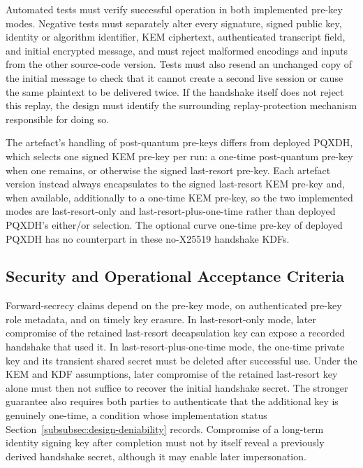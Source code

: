 Automated tests must verify successful operation in both implemented pre-key modes. Negative tests must separately alter every signature, signed public key, identity or algorithm identifier, KEM ciphertext, authenticated transcript field, and initial encrypted message, and must reject malformed encodings and inputs from the other source-code version. Tests must also resend an unchanged copy of the initial message to check that it cannot create a second live session or cause the same plaintext to be delivered twice. If the handshake itself does not reject this replay, the design must identify the surrounding replay-protection mechanism responsible for doing so.

The artefact's handling of post-quantum pre-keys differs from deployed PQXDH, which selects one signed KEM pre-key per run: a one-time post-quantum pre-key when one remains, or otherwise the signed last-resort pre-key. Each artefact version instead always encapsulates to the signed last-resort KEM pre-key and, when available, additionally to a one-time KEM pre-key, so the two implemented modes are last-resort-only and last-resort-plus-one-time rather than deployed PQXDH's either/or selection. The optional curve one-time pre-key of deployed PQXDH has no counterpart in these no-X25519 handshake KDFs.

\subsection{Security and Operational Acceptance Criteria}
\label{app:security-operational-criteria}

Forward-secrecy claims depend on the pre-key mode, on authenticated pre-key role metadata, and on timely key erasure. In last-resort-only mode, later compromise of the retained last-resort decapsulation key can expose a recorded handshake that used it. In last-resort-plus-one-time mode, the one-time private key and its transient shared secret must be deleted after successful use. Under the KEM and KDF assumptions, later compromise of the retained last-resort key alone must then not suffice to recover the initial handshake secret. The stronger guarantee also requires both parties to authenticate that the additional key is genuinely one-time, a condition whose implementation status Section~\ref{subsubsec:design-deniability} records. Compromise of a long-term identity signing key after completion must not by itself reveal a previously derived handshake secret, although it may enable later impersonation.

